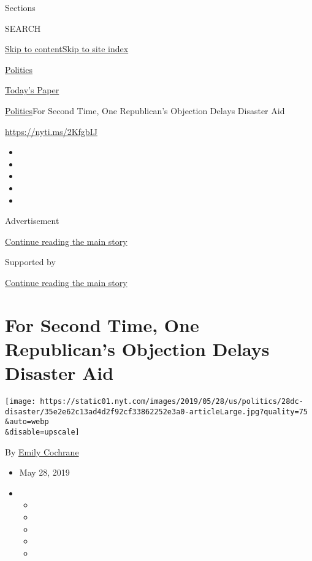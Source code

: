 Sections

SEARCH

\protect\hyperlink{site-content}{Skip to
content}\protect\hyperlink{site-index}{Skip to site index}

\href{https://www.nytimes.com/section/politics}{Politics}

\href{https://myaccount.nytimes.com/auth/login?response_type=cookie\&client_id=vi}{}

\href{https://www.nytimes.com/section/todayspaper}{Today's Paper}

\href{/section/politics}{Politics}\textbar{}For Second Time, One
Republican's Objection Delays Disaster Aid

\url{https://nyti.ms/2KfgbIJ}

\begin{itemize}
\item
\item
\item
\item
\item
\end{itemize}

Advertisement

\protect\hyperlink{after-top}{Continue reading the main story}

Supported by

\protect\hyperlink{after-sponsor}{Continue reading the main story}

\hypertarget{for-second-time-one-republicans-objection-delays-disaster-aid}{%
\section{For Second Time, One Republican's Objection Delays Disaster
Aid}\label{for-second-time-one-republicans-objection-delays-disaster-aid}}

\texttt{[image: https://static01.nyt.com/images/2019/05/28/us/politics/28dc-disaster/35e2e62c13ad4d2f92cf33862252e3a0-articleLarge.jpg?quality=75\\\&auto=webp\\\&disable=upscale]}

By \href{https://www.nytimes.com/by/emily-cochrane}{Emily Cochrane}

\begin{itemize}
\item
  May 28, 2019
\item
  \begin{itemize}
  \item
  \item
  \item
  \item
  \item
  \end{itemize}
\end{itemize}

